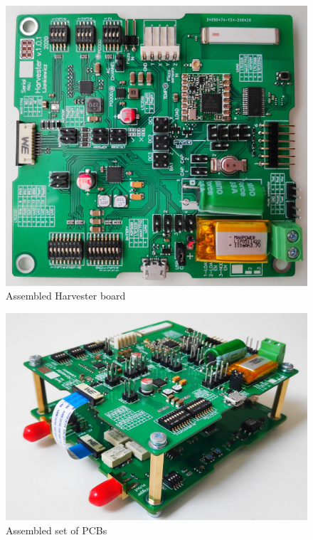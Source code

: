 \documentclass[12pt,a4paper]{article}
\begin{document}
\begin{figure}[ht!]
\includegraphics[scale=0.17]{harvester.jpg}
\caption{Assembled Harvester board}
\label{fig:harvesterreal}
\end{figure}

\begin{figure}[ht!]
\includegraphics[scale=0.17]{assembled.jpg}
\caption{Assembled set of PCBs}
\label{fig:assembled}
\end{figure}



\clearpage

\printbibliography

% 
%
\end{document}

